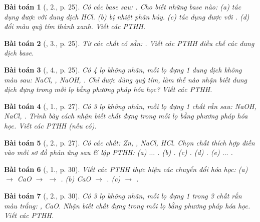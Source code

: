 \documentclass{article}
\newtheorem{baitoan}{Bài toán}
\begin{document}
\begin{baitoan}[\cite{SGK_Hoa_Hoc_9}, 2., p. 25]
	Có các base sau: \emph{}. Cho biết những base nào: (a) tác dụng được với dung dịch \emph{HCl}. (b) bị nhiệt phân hủy. (c) tác dụng được với \emph{}. (d) đổi màu quỳ tím thành xanh. Viết các PTHH.
\end{baitoan}

\begin{baitoan}[\cite{SGK_Hoa_Hoc_9}, 3., p. 25]
	Từ các chất có sẵn: \emph{}. Viết các PTHH điều chế các dung dịch base.
\end{baitoan}

\begin{baitoan}[\cite{SGK_Hoa_Hoc_9}, 4., p. 25]
	Có 4 lọ không nhãn, mỗi lọ đựng 1 dung dịch không màu sau: \emph{NaCl, , NaOH, }. Chỉ được dùng quỳ tím, làm thế nào nhận biết dung dịch đựng trong mỗi lọ bằng phương pháp hóa học? Viết các PTHH.
\end{baitoan}

\begin{baitoan}[\cite{SGK_Hoa_Hoc_9}, 1., p. 27]
	Có 3 lọ không nhãn, mỗi lọ đựng 1 chất rắn sau: \emph{NaOH, NaCl, }. Trình bày cách nhận biết chất đựng trong mỗi lọ bằng phương pháp hóa học. Viết các PTHH (nếu có).
\end{baitoan}

\begin{baitoan}[\cite{SGK_Hoa_Hoc_9}, 2., p. 27]
	Có các chất: \emph{Zn, , NaCl, HCl}. Chọn chất thích hợp điền vào mỗi sơ đồ phản ứng sau \& lập PTHH: (a) \emph{$\ldots$ }. (b) \emph{}. (c) \emph{}. (d) \emph{}. (e) \emph{$\ldots$ }.
\end{baitoan}

\begin{baitoan}[\cite{SGK_Hoa_Hoc_9}, 1., p. 30]
	Viết các PTHH thực hiện các chuyển đổi hóa học: (a) \emph{ $\to$ CaO $\to$  $\to$ }. (b) \emph{CaO $\to$ }. (c) \emph{ $\to$ }.
\end{baitoan}

\begin{baitoan}[\cite{SGK_Hoa_Hoc_9}, 2., p. 30]
	Có 3 lọ không nhãn, mỗi lọ đựng 1 trong 3 chất rắn màu trắng: \emph{, CaO}. Nhận biết chất đựng trong mỗi lọ bằng phương pháp hóa học. Viết các PTHH.
\end{baitoan}
\end{document}
